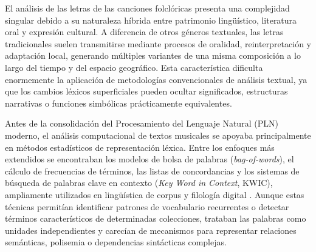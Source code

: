 
El análisis de las letras de las canciones folclóricas presenta una complejidad singular debido a su naturaleza híbrida entre patrimonio lingüístico, literatura oral y expresión cultural. A diferencia de otros géneros textuales, las letras tradicionales suelen transmitirse mediante procesos de oralidad, reinterpretación y adaptación local, generando múltiples variantes de una misma composición a lo largo del tiempo y del espacio geográfico. Esta característica dificulta enormemente la aplicación de metodologías convencionales de análisis textual, ya que los cambios léxicos superficiales pueden ocultar significados, estructuras narrativas o funciones simbólicas prácticamente equivalentes.

Antes de la consolidación del Procesamiento del Lenguaje Natural (PLN) moderno, el análisis computacional de textos musicales se apoyaba principalmente en métodos estadísticos de representación léxica. Entre los enfoques más extendidos se encontraban los modelos de bolsa de palabras (\textit{bag-of-words}), el cálculo de frecuencias de términos, las listas de concordancias y los sistemas de búsqueda de palabras clave en contexto (\textit{Key Word in Context}, KWIC), ampliamente utilizados en lingüística de corpus y filología digital \citep{jurafsky2000speech}. Aunque estas técnicas permitían identificar patrones de vocabulario recurrentes o detectar términos característicos de determinadas colecciones, trataban las palabras como unidades independientes y carecían de mecanismos para representar relaciones semánticas, polisemia o dependencias sintácticas complejas.

